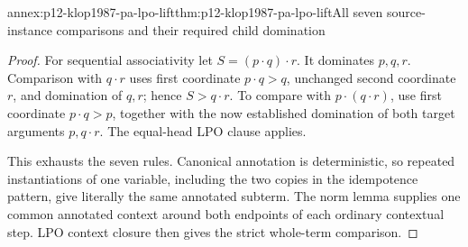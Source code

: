 \begin{annexitem}{annex:p12-klop1987-pa-lpo-lift}{thm:p12-klop1987-pa-lpo-lift}{All seven source-instance comparisons and their required child domination}
\begin{proof}
For sequential associativity let \(S=(p\cdot q)\cdot r\).
It dominates \(p,q,r\). Comparison with \(q\cdot r\)
uses first coordinate \(p\cdot q>q\), unchanged second
coordinate \(r\), and domination of \(q,r\); hence
\(S>q\cdot r\). To compare with \(p\cdot(q\cdot r)\),
use first coordinate \(p\cdot q>p\), together with the
now established domination of both target arguments
\(p,q\cdot r\). The equal-head LPO clause applies.

This exhausts the seven rules. Canonical annotation is deterministic,
so repeated instantiations of one variable, including the two
copies in the idempotence pattern, give literally the same
annotated subterm. The norm lemma supplies one common annotated
context around both endpoints of each ordinary contextual step.
LPO context closure then gives the strict whole-term comparison.
\end{proof}
\end{annexitem}

